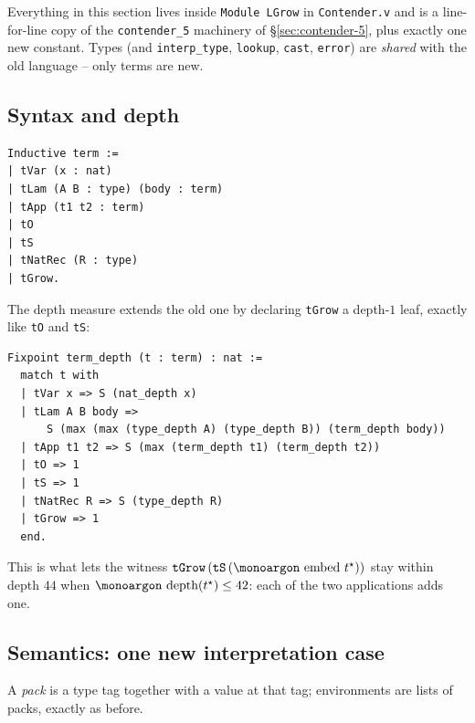 \documentclass[11pt,a4paper]{article}
\theoremstyle{plain}
\theoremstyle{definition}
\theoremstyle{remark}
\newcommand{\opname}[1]{\mathop{\text{\monoargon #1}}\nolimits}
\newcommand{\depth}{\opname{depth}}
\newcommand{\embed}{\opname{embed}}
\begin{document}
Everything in this section lives inside \texttt{Module LGrow} in
\texttt{Contender.v} and is a line-for-line copy of the
\texttt{contender\_5} machinery of \S\ref{sec:contender-5}, plus
exactly one new constant.  Types (and \texttt{interp\_type},
\texttt{lookup}, \texttt{cast}, \texttt{error}) are \emph{shared} with
the old language -- only terms are new.

\subsection{Syntax and depth}

\begin{lstlisting}
Inductive term :=
| tVar (x : nat)
| tLam (A B : type) (body : term)
| tApp (t1 t2 : term)
| tO
| tS
| tNatRec (R : type)
| tGrow.
\end{lstlisting}

The depth measure extends the old one by declaring \texttt{tGrow} a
depth-$1$ leaf, exactly like \texttt{tO} and \texttt{tS}:

\begin{lstlisting}
Fixpoint term_depth (t : term) : nat :=
  match t with
  | tVar x => S (nat_depth x)
  | tLam A B body =>
      S (max (max (type_depth A) (type_depth B)) (term_depth body))
  | tApp t1 t2 => S (max (term_depth t1) (term_depth t2))
  | tO => 1
  | tS => 1
  | tNatRec R => S (type_depth R)
  | tGrow => 1
  end.
\end{lstlisting}

This is what lets the witness
$\texttt{tGrow}\,(\texttt{tS}\,(\embed\,t^\star))$ stay within depth
$44$ when $\depth(t^\star) \leq 42$: each of the two applications
adds one.

\subsection{Semantics: one new interpretation case}

A \emph{pack} is a type tag together with a value at that tag;
environments are lists of packs, exactly as before.
\end{document}
